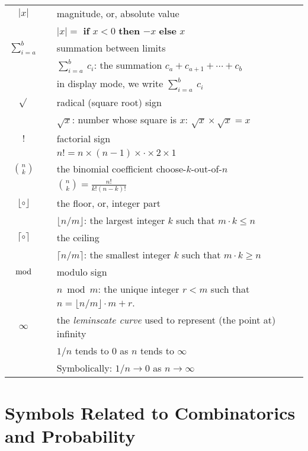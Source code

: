 \begin{tabular}{c|cl}
$|x|$
  & & magnitude, or, absolute value \\
  & & $|x| =$ {\bf if} $x<0$ {\bf then} $-x$ {\bf else} $x$ \\ \hline
$\displaystyle \sum_{i=a}^b$
  & & summation between limits \\
  & & $\sum_{i=a}^b \ c_i$: the summation $c_a + c_{a+1} + \cdots + c_b$ \\
  & & in display mode, we write $\displaystyle \sum_{i=a}^b \ c_i$  \\ \hline
$\sqrt{}$
  & & radical (square root) sign \\
  & & $\sqrt{x}$: number whose square is $x$: $\sqrt{x} \times \sqrt{x} = x$ \\ \hline
$!$
  & & factorial sign \\
  & & $n! = n \times (n-1) \times \cdot \times 2 \times 1$ \\ \hline
$\displaystyle {n \choose k}$ 
  & & the binomial coefficient choose-$k$-out-of-$n$ \\
  & & $\displaystyle {n \choose k} = \frac{n!}{k! (n-k)!}$ \\ \hline
$\lfloor \circ \rfloor$
  & & the floor, or, integer part \\
  & & $\lfloor n/m \rfloor$: the largest integer $k$ such that $m \cdot k \leq n$ \\ \hline
$\lceil \circ \rceil$
  & & the ceiling \\
  & & $\lceil n/m \rceil$: the smallest integer $k$ such that $m \cdot k \geq n$ \\ \hline
$\bmod$
  & & modulo sign\\
  & & $n \bmod m$: the unique integer $r < m$ such that $n =  \lfloor n/m \rfloor \cdot m + r$. \\ \hline
$\infty$
  & & the {\it leminscate curve} used to represent (the point at) infinity \\
  & & $1/n$ tends to $0$ as $n$ tends to $\infty$ \\
  & & Symbolically: $1/n \rightarrow 0$ as $n \rightarrow \infty$ \\ \hline
\end{tabular}

\section*{Symbols Related to Combinatorics and Probability}

